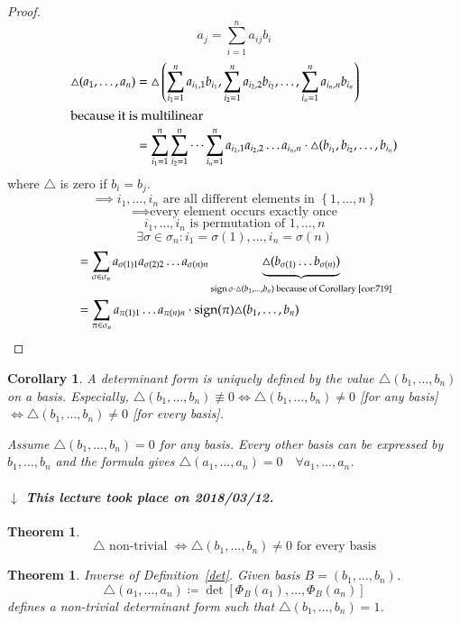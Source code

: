 \documentclass{article}
\newcounter{lecref}[section]
\numberwithin{lecref}{section}
\newtheorem{theorem}[lecref]{Theorem}
\newtheorem{corollary}[lecref]{Corollary}
\newcommand{\set}[1]{\left\{#1\right\}}
\newcommand{\dateref}[1]{%
  \begin{mdframed}[backgroundcolor=gray!10,innerbottommargin=0pt,innertopmargin=0pt]
    \paragraph{\textit{$\downarrow$ This lecture took place on #1.}}%
  \end{mdframed}%
}
\DeclareMathOperator{\sign}{sign}
\begin{document}
\begin{proof}
  \[ a_j = \sum_{i=1}^n a_{ij} b_i \]
  \begin{align*}
    \triangle(a_1, \dots, a_n) &= \triangle\left(\sum_{i_1 = 1}^n a_{i_1,1} b_{i_1}, \sum_{i_2 = 1}^n a_{i_2,2} b_{i_2}, \dots, \sum_{i_n = 1}^n a_{i_n, n} b_{i_n}\right) \\
    \intertext{because it is multilinear}
      &= \sum_{i_1 = 1}^n \sum_{i_2=1}^n \dots \sum_{i_n=1}^n a_{i_1,1} a_{i_2,2} \dots a_{i_n,n} \cdot \triangle(b_{i_1}, b_{i_2}, \dots, b_{i_n})
  \end{align*}
  where $\triangle$ is zero if $b_i = b_j$.
  \[ \implies i_1,\dots,i_n \text{ are all different elements in } \set{1,\dots,n} \]
  \[ \implies \text{every element occurs exactly once} \]
  \[ i_1,\dots,i_n \text{ is permutation of } 1,\dots,n \]
  \[ \exists \sigma \in \sigma_n: i_1 = \sigma(1), \dots, i_n = \sigma(n) \]
  \begin{align*}
    &= \sum_{\sigma \in \sigma_n} a_{\sigma(1) 1} a_{\sigma(2) 2} \dots a_{\sigma(n) n} \underbrace{\triangle(b_{\sigma(1)} \dots b_{\sigma(n)})}_{\sign\sigma \cdot \triangle(b_1, \dots, b_n) \text{ because of Corollary~\ref{cor:719}}} \\
    &= \sum_{\pi \in \sigma_n} a_{\pi(1) 1} \dots a_{\pi(n) n} \cdot \sign(\pi) \triangle(b_1, \dots, b_n)
  \end{align*}
\end{proof}

\begin{corollary}
  A determinant form is uniquely defined by the value $\triangle(b_1, \dots, b_n)$ on a basis.
  Especially, $\triangle(b_1, \dots, b_n) \not\equiv 0 \iff \triangle(b_1,\dots,b_n) \neq 0$ [for any basis] $\iff \triangle(b_1,\dots,b_n) \neq 0$ [for every basis].

  Assume $\triangle(b_1,\dots,b_n) = 0$ for any basis.
  Every other basis can be expressed by $b_1, \dots ,b_n$ and the formula gives $\triangle(a_1, \dots, a_n) = 0 \quad \forall a_1,\dots,a_n$.
\end{corollary}

\dateref{2018/03/12}

\begin{theorem} %
  \[ \triangle \text{ non-trivial } \iff \triangle(b_1, \dots, b_n) \neq 0 \text{ for every basis} \]
\end{theorem}

\begin{theorem} %
  \label{theorem722}
  Inverse of Definition~\ref{det}. %
  Given basis $B = (b_1, \dots, b_n)$.
  \[ \triangle(a_1, \dots, a_n) \coloneqq \det\left[\Phi_B(a_1), \dots, \Phi_B(a_n)\right] \]
  defines a non-trivial determinant form such that $\triangle(b_1, \dots, b_n) = 1$.
\end{theorem}
\end{document}
